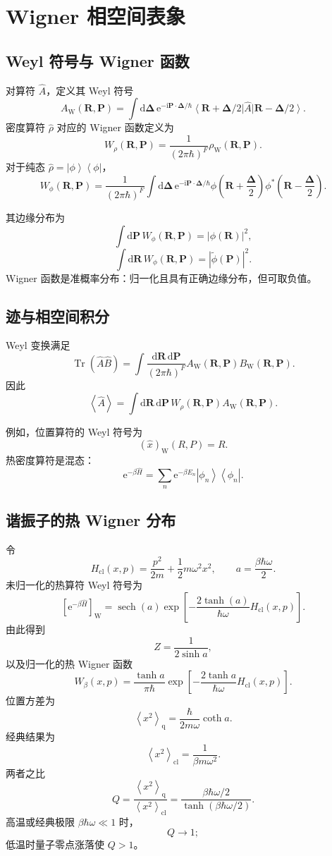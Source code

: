 \documentclass[11pt,a4paper,oneside,openany,fontset=fandol]{ctexbook}
\newcommand{\dd}{\mathrm{d}}
\newcommand{\ee}{\mathrm{e}}
\newcommand{\ii}{\mathrm{i}}
\newcommand{\Tr}{\operatorname{Tr}}
\newcommand{\ket}[1]{\left|#1\right\rangle}
\newcommand{\bra}[1]{\left\langle#1\right|}
\newcommand{\avg}[1]{\left\langle #1\right\rangle}
\newcommand{\vct}[1]{\bm{#1}}
\newcommand{\Wig}{\mathrm{W}}
\begin{document}
\chapter{Wigner 相空间表象}

\section{Weyl 符号与 Wigner 函数}

对算符 $\hat A$，定义其 Weyl 符号
\[
A_{\Wig}(\vct R,\vct P)
=
\int\dd\vct\Delta\,
\ee^{-\ii\vct P\cdot\vct\Delta/\hbar}
\bra{\vct R+\vct\Delta/2}
\hat A
\ket{\vct R-\vct\Delta/2}.
\]
密度算符 $\hat\rho$ 对应的 Wigner 函数定义为
\[
W_\rho(\vct R,\vct P)
=
\frac{1}{(2\pi\hbar)^F}\rho_{\Wig}(\vct R,\vct P).
\]
对于纯态 $\hat\rho=\ket{\phi}\bra{\phi}$，
\[
W_\phi(\vct R,\vct P)
=
\frac{1}{(2\pi\hbar)^F}
\int\dd\vct\Delta\,
\ee^{-\ii\vct P\cdot\vct\Delta/\hbar}
\phi\!\left(\vct R+\frac{\vct\Delta}{2}\right)
\phi^*\!\left(\vct R-\frac{\vct\Delta}{2}\right).
\]

其边缘分布为
\[
\int\dd\vct P\,W_\phi(\vct R,\vct P)
=
|\phi(\vct R)|^2,
\]
\[
\int\dd\vct R\,W_\phi(\vct R,\vct P)
=
|\widetilde\phi(\vct P)|^2.
\]
Wigner 函数是准概率分布：归一化且具有正确边缘分布，但可取负值。

\section{迹与相空间积分}

Weyl 变换满足
\[
\boxed{
\Tr(\hat A\hat B)
=
\int\frac{\dd\vct R\,\dd\vct P}{(2\pi\hbar)^F}
A_{\Wig}(\vct R,\vct P)
B_{\Wig}(\vct R,\vct P)
}.
\]
因此
\[
\avg{\hat A}
=
\int\dd\vct R\,\dd\vct P\,
W_\rho(\vct R,\vct P)
A_{\Wig}(\vct R,\vct P).
\]

例如，位置算符的 Weyl 符号为
\[
(\hat x)_{\Wig}(R,P)=R.
\]
热密度算符是混态：
\[
\ee^{-\beta\hat H}
=
\sum_n
\ee^{-\beta E_n}
\ket{\phi_n}\bra{\phi_n}.
\]

\section{谐振子的热 Wigner 分布}

令
\[
H_{\mathrm{cl}}(x,p)
=
\frac{p^2}{2m}
+\frac12m\omega^2x^2,
\qquad
a=\frac{\beta\hbar\omega}{2}.
\]
未归一化的热算符 Weyl 符号为
\[
\left[\ee^{-\beta\hat H}\right]_{\Wig}
=
\operatorname{sech}(a)
\exp\left[
-\frac{2\tanh(a)}{\hbar\omega}
H_{\mathrm{cl}}(x,p)
\right].
\]
由此得到
\[
Z
=
\frac{1}{2\sinh a},
\]
以及归一化的热 Wigner 函数
\[
W_\beta(x,p)
=
\frac{\tanh a}{\pi\hbar}
\exp\left[
-\frac{2\tanh a}{\hbar\omega}
H_{\mathrm{cl}}(x,p)
\right].
\]
位置方差为
\[
\avg{x^2}_{\mathrm q}
=
\frac{\hbar}{2m\omega}\coth a.
\]
经典结果为
\[
\avg{x^2}_{\mathrm{cl}}
=
\frac{1}{\beta m\omega^2}.
\]
两者之比
\[
\boxed{
Q
=
\frac{\avg{x^2}_{\mathrm q}}
{\avg{x^2}_{\mathrm{cl}}}
=
\frac{\beta\hbar\omega/2}
{\tanh(\beta\hbar\omega/2)}
}.
\]
高温或经典极限 $\beta\hbar\omega\ll1$ 时，
\[
Q\to1;
\]
低温时量子零点涨落使 $Q>1$。
\end{document}
